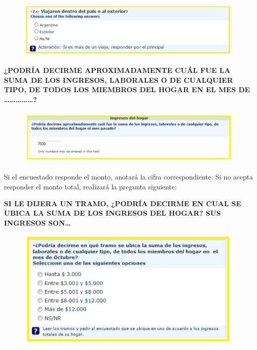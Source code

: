 \documentclass[
  openany]{book}
\begin{document}
\begin{figure}

{\centering \includegraphics[width=1\linewidth]{imagenes/figura6-144} 

}

\end{figure}

\textbf{¿PODRÍA DECIRME APROXIMADAMENTE CUÁL FUE LA SUMA DE LOS INGRESOS, LABORALES O DE CUALQUIER TIPO, DE TODOS LOS MIEMBROS DEL HOGAR EN EL MES DE \ldots\ldots\ldots\ldots\ldots?}

\begin{figure}

{\centering \includegraphics[width=1\linewidth]{imagenes/figura6-145} 

}

\end{figure}

Si el encuestado responde el monto, anotará la cifra correspondiente. Si no acepta responder el monto total, realizará la pregunta siguiente:

\textbf{SI LE DIJERA UN TRAMO, ¿PODRÍA DECIRME EN CUAL SE UBICA LA SUMA DE LOS INGRESOS DEL HOGAR? SUS INGRESOS SON\ldots{}}

\begin{figure}

{\centering \includegraphics[width=1\linewidth]{imagenes/figura6-146} 

}

\end{figure}
\end{document}
